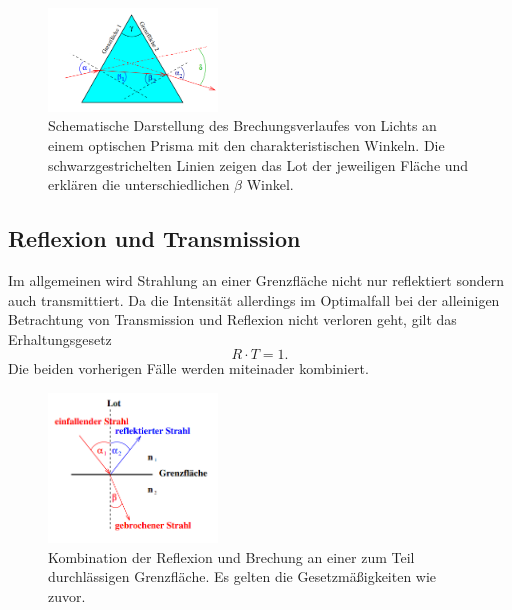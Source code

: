 \begin{figure}
    \centering
    \includegraphics[width=0.4\textwidth]{bilder/5.png}
    \caption{Schematische Darstellung des Brechungsverlaufes von Lichts an einem optischen Prisma mit den charakteristischen Winkeln. Die schwarzgestrichelten Linien zeigen das Lot der jeweiligen Fläche und erklären die unterschiedlichen $\beta$ Winkel. \cite{skript}}
    \label{fig:prisma}
\end{figure}

\newpage

\subsection{Reflexion und Transmission}
Im allgemeinen wird Strahlung an einer Grenzfläche nicht nur reflektiert sondern auch transmittiert. Da die Intensität allerdings im Optimalfall bei der alleinigen Betrachtung von Transmission und Reflexion nicht verloren geht, gilt das Erhaltungsgesetz
\begin{equation*}
R \cdot T = 1.
\end{equation*}
Die beiden vorherigen Fälle werden miteinader kombiniert.
\begin{figure}
    \centering
    \includegraphics[width=0.4\textwidth]{bilder/3.png}
    \caption{Kombination der Reflexion und Brechung an einer zum Teil durchlässigen Grenzfläche. Es gelten die Gesetzmäßigkeiten wie zuvor. \cite{skript}}
    \label{fig:combo}
\end{figure}

